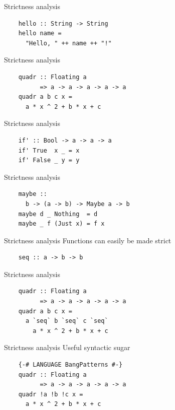 \documentclass[20pt]{beamer}
\newcommand{\vspaced}{
    \vspace{5mm}
}
\begin{document}
\begin{frame}[fragile]{Strictness analysis}
    \begin{lstlisting}
    hello :: String -> String
    hello name =
      "Hello, " ++ name ++ "!"
    \end{lstlisting}
\end{frame}

\begin{frame}[fragile]{Strictness analysis}
    \begin{lstlisting}
    quadr :: Floating a
          => a -> a -> a -> a -> a
    quadr a b c x =
      a * x ^ 2 + b * x + c
    \end{lstlisting}
\end{frame}

\begin{frame}[fragile]{Strictness analysis}
    \begin{lstlisting}
    if' :: Bool -> a -> a -> a
    if' True  x _ = x
    if' False _ y = y
    \end{lstlisting}
\end{frame}

\begin{frame}[fragile]{Strictness analysis}
    \begin{lstlisting}
    maybe ::
      b -> (a -> b) -> Maybe a -> b
    maybe d _ Nothing  = d
    maybe _ f (Just x) = f x
    \end{lstlisting}
\end{frame}

\begin{frame}[fragile]{Strictness analysis}
    Functions can easily be made strict \\
    \vspaced
    \begin{lstlisting}
    seq :: a -> b -> b
    \end{lstlisting}
\end{frame}

\begin{frame}[fragile]{Strictness analysis}
    \begin{lstlisting}
    quadr :: Floating a
          => a -> a -> a -> a -> a
    quadr a b c x =
      a `seq` b `seq` c `seq`
        a * x ^ 2 + b * x + c
    \end{lstlisting}
\end{frame}

\begin{frame}[fragile]{Strictness analysis}
    Useful syntactic sugar \\
    \vspaced
    \begin{lstlisting}
    {-# LANGUAGE BangPatterns #-}
    quadr :: Floating a
          => a -> a -> a -> a -> a
    quadr !a !b !c x =
      a * x ^ 2 + b * x + c
    \end{lstlisting}
\end{frame}
\end{document}
